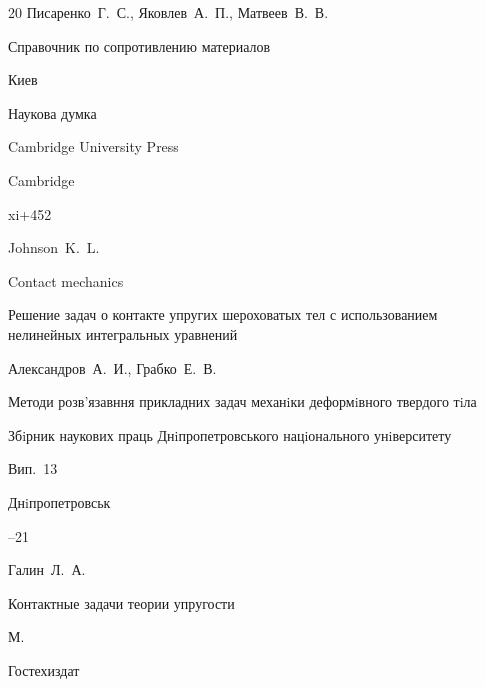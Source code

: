 \begin{thebibliography}{20}
\by Писаренко~Г.~С., Яковлев~А.~П., Матвеев~В.~В.

\book Справочник по сопротивлению материалов

\publaddr  Киев

\publ Наукова думка









\publ Cambridge University Press

\publaddr Cambridge

\totalpages  xi+452

\by Johnson~K.~L.

\book Contact mechanics







\paper Решение задач о контакте упругих шероховатых тел с использованием нелинейных интегральных уравнений

\by Александров~А.~И., Грабко~Е.~В.

\inbook Методи розв'язавння прикладних задач механiки деформiвного твердого тiла

\bookinfo Збiрник наукових праць Днiпропетровського нацiонального унiверситету

\volinfo Вип.~13

\publaddr Днiпропетровськ


--21






\by Галин~Л.~А.

\book Контактные задачи теории упругости

\publaddr  М.

\publ Гостехиздат





\end{thebibliography}



\RuDate



